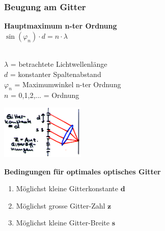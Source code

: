 \subsubsection{Beugung am Gitter}
\begin{minipage}{6cm}
	\textbf{Hauptmaximum n-ter Ordnung}\\
	$\boxed{\sin(\varphi_n) \cdot d = n \cdot \lambda}$\\
	\\
	\begin{minipage}{6cm}
		$\lambda$ = betrachtete Lichtwellenlänge\\
		$d$ = konstanter Spaltenabstand\\
		$\varphi_n$ = Maximumwinkel n-ter Ordnung \\
		$n$ = 0,1,2,... = Ordnung
	\end{minipage}
\end{minipage}
\begin{minipage}{5cm}
	\includegraphics[width = 4cm]{./bilder/beugung-gitter}
\end{minipage}
\begin{minipage}{8cm}
	\textbf{Bedingungen für optimales optisches Gitter}
	\begin{enumerate}
		\item Möglichst kleine Gitterkonstante $\mathbf{d}$
		\item Möglichst grosse Gitter-Zahl $\mathbf{z}$
		\item Möglichst kleine Gitter-Breite $\mathbf{s}$
	\end{enumerate}
\end{minipage}\\
\\ \\

